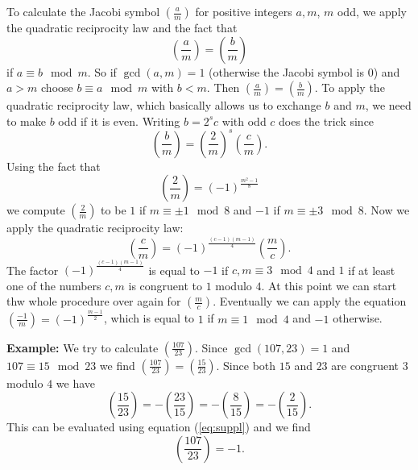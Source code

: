 \documentclass[12pt]{article}
\begin{document}
To calculate the Jacobi symbol $\left(\frac{a}{m}\right)$ for positive integers $a,m$, $m$ odd, we apply the quadratic reciprocity law and the fact that
$$\left(\frac{a}{m}\right)=\left(\frac{b}{m}\right)$$
if $a\equiv b\mod m$. So if $\gcd(a,m)=1$ (otherwise the Jacobi symbol is $0$) and $a>m$ choose $b\equiv a\mod m$ with $b<m$. Then $\left(\frac{a}{m}\right)=\left(\frac{b}{m}\right)$. To apply the quadratic reciprocity law, which basically allows us to exchange $b$ and $m$, we need to make $b$ odd if it is even. Writing $b=2^sc$ with odd $c$ does the trick since
$$\left(\frac{b}{m}\right)=\left(\frac{2}{m}\right)^s\left(\frac{c}{m}\right).$$
Using the fact that 
\begin{equation}\label{eq:suppl}
\left(\frac{2}{m}\right)=(-1)^\frac{m^2-1}{8}
\end{equation}
we compute $\left(\frac{2}{m}\right)$ to be $1$ if $m\equiv\pm 1\mod 8$ and $-1$ if $m\equiv\pm 3\mod 8$.
Now we apply the quadratic reciprocity law:
$$\left(\frac{c}{m}\right)=(-1)^\frac{(c-1)(m-1)}{4}\left(\frac{m}{c}\right).$$
The factor $(-1)^\frac{(c-1)(m-1)}{4}$ is equal to $-1$ if $c,m\equiv 3\mod 4$ and $1$ if at least one of the numbers $c,m$ is congruent to $1$ modulo $4$. At this point we can start thw whole procedure over again for $\left(\frac{m}{c}\right)$. Eventually we can apply the equation $\left(\frac{-1}{m}\right)=(-1)^\frac{m-1}{2}$, which is equal to $1$ if $m\equiv 1\mod 4$ and $-1$ otherwise.

\textbf{Example:} We try to calculate $\left(\frac{107}{23}\right)$. Since $\gcd(107,23)=1$ and $107\equiv15\mod23$ we find $\left(\frac{107}{23}\right)=\left(\frac{15}{23}\right)$. Since both $15$ and $23$ are congruent $3$ modulo $4$ we have 
$$\left(\frac{15}{23}\right)=-\left(\frac{23}{15}\right)=-\left(\frac{8}{15}\right)=-\left(\frac{2}{15}\right).$$ 
This can be evaluated using equation (\ref{eq:suppl}) and we find
$$\left(\frac{107}{23}\right)=-1.$$
\end{document}
